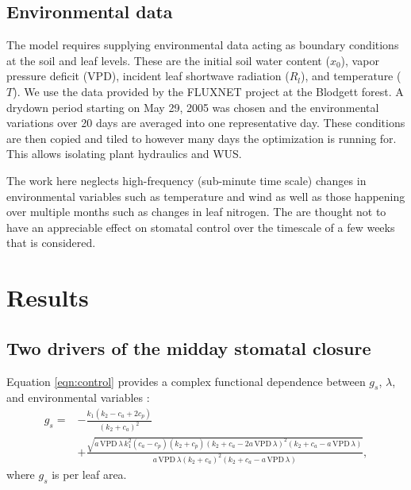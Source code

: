 \documentclass[utf8]{frontiersSCNS} %
\begin{document}
\subsection{Environmental data} 

The model requires supplying environmental data acting as boundary conditions at the soil and leaf levels. These are the initial soil water content ($x_0$), vapor pressure deficit (VPD), incident leaf shortwave radiation ($R_l$), and temperature ($T$). We use the data provided by the FLUXNET project at the Blodgett forest. A drydown period starting on May 29, 2005 was chosen and the environmental variations over 20 days are averaged into one representative day. These conditions are then copied and tiled to however many days the optimization is running for. This allows isolating plant hydraulics and WUS.

The work here neglects high-frequency (sub-minute time scale) changes in environmental variables such as temperature and wind as well as those happening over multiple months such as changes in leaf nitrogen. The are thought not to have an appreciable effect on stomatal control over the timescale of a few weeks that is considered.

\section{Results}

\subsection{Two drivers of the midday stomatal closure}

Equation \ref{eqn:control} provides a complex functional dependence between $g_s$, $\lambda$, and environmental variables \citep{Katul2009a}:
\begin{equation}
    \label{eqn:gs_vs_env_lambda}
    \begin{split}
        g_s = & - \frac{k_1 (k_2-c_a+2 c_p)}{(k_2+c_a)^2} \\
        & +\frac{\sqrt{a\, \text{VPD}\, \lambda\, k_1^2 (c_a-c_p)(k_2+c_p)(k_2+c_a-2 a\, \text{VPD}\, \lambda)^2(k_2+c_a-a\, \text{VPD}\, \lambda)}}{a\, \text{VPD}\, \lambda (k_2+c_a)^2(k_2+c_a-a\, \text{VPD}\, \lambda)} ,
    \end{split}
\end{equation}
where $g_s$ is per leaf area.
\end{document}
